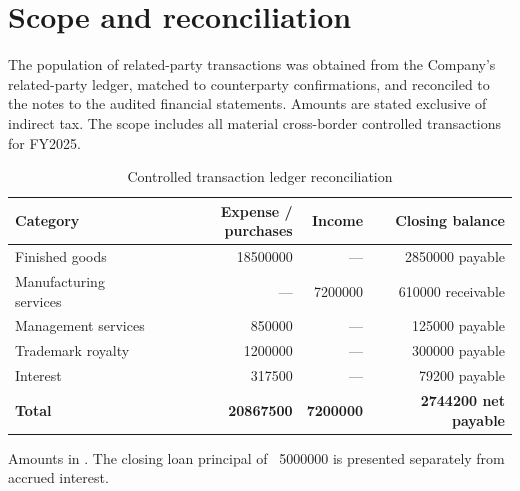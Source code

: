 \section{Scope and reconciliation}
The population of related-party transactions was obtained from the Company's
related-party ledger, matched to counterparty confirmations, and reconciled to
the notes to the audited financial statements. Amounts are stated exclusive of
indirect tax. The scope includes all material cross-border controlled
transactions for FY2025.

\begin{table}[htbp]
  \centering
  \caption{Controlled transaction ledger reconciliation}
  \label{tab:ledger}
  \begin{tabularx}{\textwidth}{@{}Y r r r@{}}
    \toprule
    \textbf{Category} & \textbf{Expense / purchases} &
      \textbf{Income} & \textbf{Closing balance}\\
    \midrule
    Finished goods & \num{18500000} & --- & \num{2850000} payable\\
    Manufacturing services & --- & \num{7200000} & \num{610000} receivable\\
    Management services & \num{850000} & --- & \num{125000} payable\\
    Trademark royalty & \num{1200000} & --- & \num{300000} payable\\
    Interest & \num{317500} & --- & \num{79200} payable\\
    \midrule
    \textbf{Total} & \textbf{\num{20867500}} & \textbf{\num{7200000}} &
      \textbf{\num{2744200} net payable}\\
    \bottomrule
  \end{tabularx}
  \begin{flushleft}\footnotesize
    Amounts in \Currency. The closing loan principal of \Currency\ \num{5000000}
    is presented separately from accrued interest.
  \end{flushleft}
\end{table}

